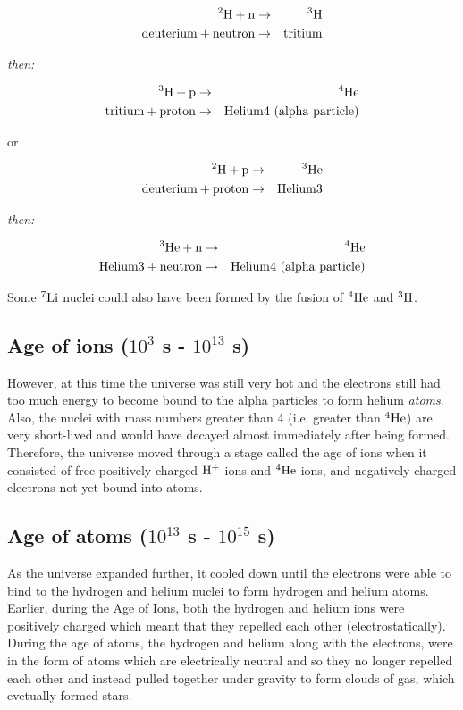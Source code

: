 \begin{eqnarray*}
^{2}\rm{H} + n & \rightarrow & ^{3}\rm{H} \\
\rm{deuterium} + \rm{neutron} & \rightarrow & \rm{tritium}
\end{eqnarray*}

\centerline{\emph{then:}}

\begin{eqnarray*}
^{3}\rm{H} + p & \rightarrow & ^{4}\rm{He} \\
\rm{tritium} + \rm{proton} & \rightarrow & \rm{Helium}\rm{4} \ \rm{(alpha} \ \rm{particle)}
\end{eqnarray*}

or

\begin{eqnarray*}
^{2}\rm{H} + p & \rightarrow & ^{3}\rm{He} \\
\rm{deuterium} + \rm{proton} & \rightarrow & \rm{Helium}\rm{3}
\end{eqnarray*}

\centerline{\emph{then:}}

\begin{eqnarray*}
^{3}\rm{He} + n & \rightarrow & ^{4}\rm{He} \\
\rm{Helium3} + \rm{neutron} & \rightarrow & \rm{Helium}\rm{4} \ \rm{(alpha} \ \rm{particle)}
\end{eqnarray*}

Some $^{7}\rm{Li}$ nuclei could also have been formed by the fusion of $^{4}\rm{He}$ and $^{3}\rm{H}$.

\subsection{Age of ions ($10^{3}$ s - $10^{13}$ s)}
However, at this time the universe was still very hot and the electrons still had too much energy to become bound to the alpha particles to form helium \emph{atoms}. Also, the nuclei with mass numbers greater than 4 (i.e. greater than $^{4}\rm{He}$) are very short-lived and would have decayed almost immediately after being formed. Therefore, the universe moved through a stage called the age of ions when it consisted of free positively charged $\rm{H}^{+}$ ions and $^{4}\rm{He}$ ions, and negatively charged electrons not yet bound into atoms.

\subsection{Age of atoms ($10^{13}$ s - $10^{15}$ s)}
As the universe expanded further, it cooled down until the electrons were able to bind to the hydrogen and helium nuclei to form hydrogen and helium atoms. Earlier, during the Age of Ions, both the hydrogen and helium ions were positively charged which meant that they repelled each other (electrostatically). During the age of atoms, the hydrogen and helium along with the electrons, were in the form of atoms which are electrically neutral and so they no longer repelled each other and instead pulled together under gravity to form clouds of gas, which evetually formed stars.


